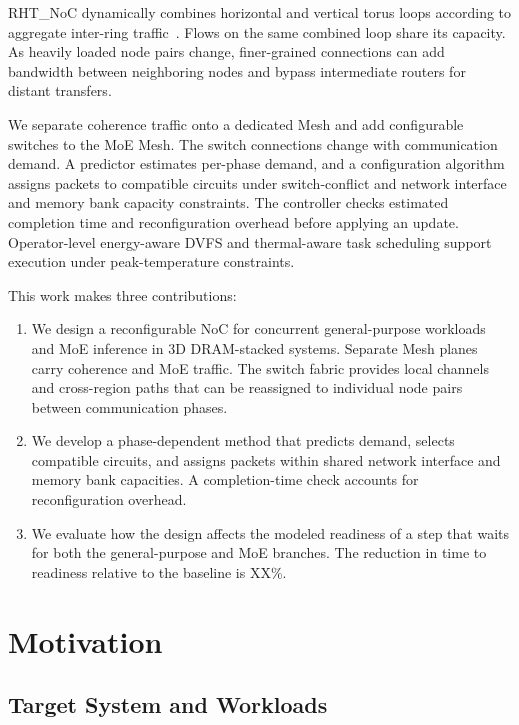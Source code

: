 \documentclass[conference,10pt]{IEEEtran}
\begin{document}
RHT\_NoC dynamically combines horizontal and vertical torus loops according
to aggregate inter-ring traffic~\cite{xu2025rhtnoc}. Flows on the same combined
loop share its capacity. As heavily loaded node pairs change, finer-grained
connections can add bandwidth between neighboring nodes and bypass
intermediate routers for distant transfers.

We separate coherence traffic onto a dedicated Mesh and add configurable
switches to the MoE Mesh. The switch connections change with communication
demand. A predictor estimates
per-phase demand, and a configuration algorithm assigns packets to compatible
circuits under switch-conflict and network interface and memory bank capacity
constraints. The controller checks estimated completion time and
reconfiguration overhead before applying an update. Operator-level
energy-aware DVFS and thermal-aware task scheduling support execution under
peak-temperature constraints.

This work makes three contributions:
\begin{enumerate}
  \item We design a reconfigurable NoC for concurrent general-purpose
  workloads and MoE inference in 3D DRAM-stacked systems. Separate Mesh
  planes carry coherence and MoE traffic. The switch fabric
  provides local channels and cross-region paths that can be reassigned to
  individual node pairs between communication phases.

  \item We develop a phase-dependent method that predicts demand, selects
  compatible circuits, and assigns packets within shared network interface
  and memory bank capacities. A completion-time check accounts for
  reconfiguration overhead.

  \item We evaluate how the design affects the modeled readiness of a step
  that waits for both the general-purpose and MoE branches. The reduction in
  time to readiness relative to the baseline is XX\%.
\end{enumerate}

\setlength{\textfloatsep}{12pt}
\setlength{\floatsep}{10pt}

\section{Motivation}
\label{sec:motivation}

\subsection{Target System and Workloads}
\label{sec:target-system-workloads}
\end{document}
